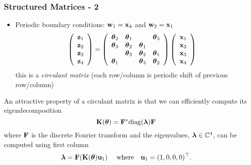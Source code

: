 \documentclass[12pt,fleqn,handout]{beamer}
\begin{document}
\begin{frame}
	\frametitle{Structured Matrices - 2}
	\begin{itemize}
		\item Periodic boundary conditions: ${\bf w}_1 = {\bf x}_4$ and ${\bf w}_2 = {\bf x}_1$
	$$
		\left( 
		\begin{array}{r}
			{\bf z}_1\\
			{\bf z}_2\\
			{\bf z}_3\\
			{\bf z}_4
		\end{array}
		\right)
		=
		\left( 
		\begin{array}{rrrr}
			        {\boldsymbol \theta}_2 & {\boldsymbol \theta}_1 &          & {\boldsymbol \theta}_3  \\
			        {\boldsymbol \theta}_3 & {\boldsymbol \theta}_2 & {\boldsymbol \theta}_1 &           \\
			                 & {\boldsymbol \theta}_3 & {\boldsymbol \theta}_2 & {\boldsymbol \theta}_1  \\
			        {\boldsymbol \theta}_1 &          & {\boldsymbol \theta}_3 & {\boldsymbol \theta}_2  \\
		\end{array}
		\right)
		\left( 
		\begin{array}{r}
			{\bf x}_1\\
			{\bf x}_2\\
			{\bf x}_3\\
			{\bf x}_4\\
		\end{array}
		\right)
	$$
	this is a \emph{circulant matrix} (each row/column is periodic shift of previous row/column)
	\end{itemize}
	\pause
	
	An attractive property of a circulant matrix is that we can efficiently compute its eigendecomposition
	$$
		{\bf K}({\boldsymbol \theta}) = {\bf F}^* {\rm diag}({\boldsymbol \lambda}) {\bf F}
	$$ 
	where ${\bf F}$ is the discrete Fourier transform and the eigenvalues, ${\boldsymbol \lambda} \in {\mathbb{C}}^4$, can be computed using first column
	$$
		{\boldsymbol \lambda} =   {\bf F}( {\bf K}({\boldsymbol \theta}) {\bf u}_1) \quad \text{ where} \quad {\bf u}_1 = (1,0,0,0)^\top.
	$$ 	
\end{frame}

%
%
%
%
\end{document}
